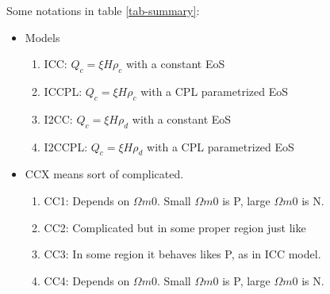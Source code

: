 \documentclass[12pt,a4paper]{article}
\begin{document}
Some notations in table \ref{tab-summary}:

\begin{itemize}
\item
Models
\begin{enumerate}
\item
ICC: $Q_c=\xi H \rho_c$ with a constant EoS
\item
ICCPL: $Q_c=\xi H \rho_c$ with a CPL parametrized EoS
\item
I2CC: $Q_c=\xi H \rho_d$ with a constant EoS
\item
I2CCPL: $Q_c=\xi H \rho_d$ with a CPL parametrized EoS
\end{enumerate}
\item
CCX means sort of complicated.
\begin{enumerate}
\item
CC1: Depends on $\Omega m0$. Small $\Omega m0$ is P, large $\Omega m0$ is N.
\item
CC2: Complicated but in some proper region just like \tabICCPLtrxi
\item
CC3: In some region it behaves likes P, as in ICC model.
\item
CC4: Depends on $\Omega m0$. Small $\Omega m0$ is P, large $\Omega m0$ is N.
\end{enumerate}


\end{itemize}


\end{document}
